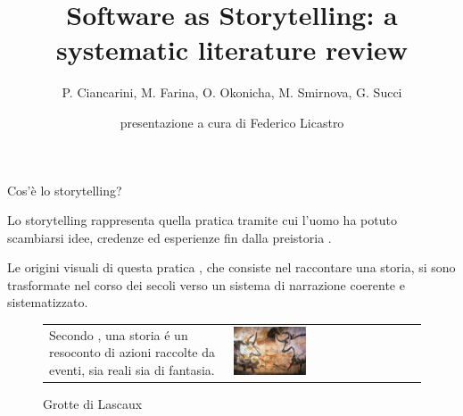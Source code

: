 \documentclass{beamer}
\title[SaSSLR]{Software as Storytelling: a systematic literature review}
\subtitle{\small P. Ciancarini, M. Farina, O. Okonicha, M. Smirnova, G. Succi}
\author{presentazione a cura di Federico Licastro}
\begin{document}
\begin{frame}
  \titlepage
\end{frame}
\begin{frame}{\centerline{Cos'è lo storytelling?}}

Lo storytelling rappresenta quella pratica tramite cui l'uomo ha potuto scambiarsi idee, credenze ed esperienze fin dalla preistoria .

   \vspace{0.5cm}
   
Le origini visuali di questa pratica \cite{feliks2011prehistory}, che consiste nel raccontare una storia, si sono trasformate nel corso dei secoli verso un sistema di narrazione coerente e sistematizzato. 

      \vspace{0.5cm}
      
      \begin{figure}[H]
  \begin{tabulary}{\textwidth}{m{5.5cm} m{5.5cm}}
        Secondo \citeauthor{Ciriello2017ProtoStory}, una storia \'e un resoconto di azioni raccolte da eventi, sia reali sia di fantasia. & \includegraphics[width=0.4\textwidth]{images/img-1.jpg}
            \caption{Grotte di Lascaux}
        \\
    \end{tabulary}
    \end{figure}


\end{frame}
\end{document}
